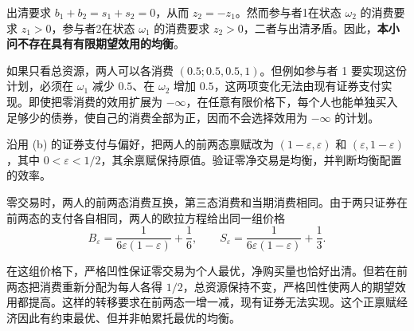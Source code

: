 \begin{solution}[blank-type=manual,blank-vsep=10\baselineskip]
\begin{enumerate}[label=(\alph*)]
出清要求 $b_1+b_2=s_1+s_2=0$，从而 $z_2=-z_1$。然而参与者1在状态 $\omega_2$ 的消费要求 $z_1>0$，参与者2在状态 $\omega_1$ 的消费要求 $z_2>0$，二者与出清矛盾。因此，\textbf{本小问不存在具有有限期望效用的均衡}。

如果只看总资源，两人可以各消费 $(0.5;0.5,0.5,1)$。但例如参与者 1 要实现这份计划，必须在 $\omega_1$ 减少 $0.5$、在 $\omega_2$ 增加 $0.5$，这两项变化无法由现有证券支付实现。即使把零消费的效用扩展为 $-\infty$，在任意有限价格下，每个人也能单独买入足够少的债券，使自己的消费全部为正，因而不会选择效用为 $-\infty$ 的计划。

\end{enumerate}
\end{solution}

\begin{tcolorbox}[example,title=补充算例（正禀赋下的约束最优）]
沿用 (b) 的证券支付与偏好，把两人的前两态禀赋改为 $(1-\varepsilon,\varepsilon)$ 和 $(\varepsilon,1-\varepsilon)$，其中 $0<\varepsilon<1/2$，其余禀赋保持原值。验证零净交易是均衡，并判断均衡配置的效率。
\begin{solution}[blank-type=manual,blank-vsep=6\baselineskip]
零交易时，两人的前两态消费互换，第三态消费和当期消费相同。由于两只证券在前两态的支付各自相同，两人的欧拉方程给出同一组价格
\[
 B_\varepsilon=\frac{1}{6\varepsilon(1-\varepsilon)}+\frac16,\qquad
 S_\varepsilon=\frac{1}{6\varepsilon(1-\varepsilon)}+\frac13.
\]

在这组价格下，严格凹性保证零交易为个人最优，净购买量也恰好出清。但若在前两态把消费重新分配为每人各得 $1/2$，总资源保持不变，严格凹性使两人的期望效用都提高。这样的转移要求在前两态一增一减，现有证券无法实现。这个正禀赋经济因此有约束最优、但并非帕累托最优的均衡。
\end{solution}
\end{tcolorbox}

